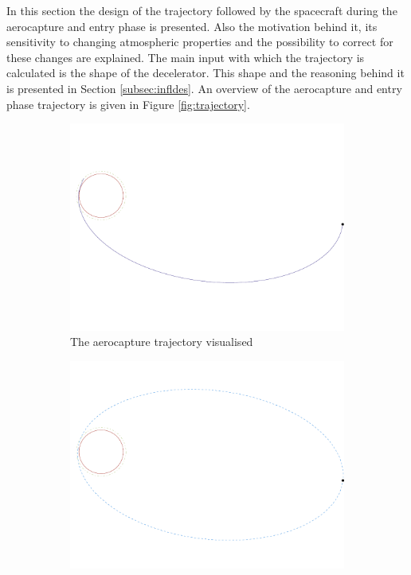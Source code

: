 In this section the design of the trajectory followed by the spacecraft during the aerocapture and entry phase is presented. Also the motivation behind it, its sensitivity to changing atmospheric properties and the possibility to correct for these changes are explained. The main input with which the trajectory is calculated is the shape of the decelerator. This shape and the reasoning behind it is presented in Section \ref{subsec:infldes}. An overview of the aerocapture and entry phase trajectory is given in Figure \ref{fig:trajectory}.

\begin{figure}
	\centering
	
	\begin{subfigure}[b]{0.7\textwidth}
		\vspace{-22mm}
		\includegraphics[width=\textwidth]{./Figure/Orbit/aerocapture_trajectory.pdf}
		\vspace{-25mm}
		\caption{The aerocapture trajectory visualised}
		\label{fig:capture_trajectory}
	\end{subfigure}
	\begin{subfigure}[b]{0.7\textwidth}
		\vspace{-10mm}
		\includegraphics[width=\textwidth]{./Figure/Orbit/parking_trajectory.pdf}

\end{subfigure}
\end{figure}
